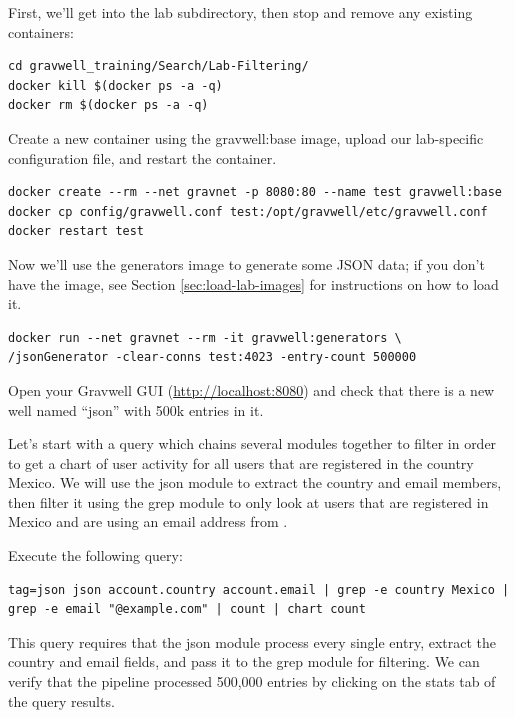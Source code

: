 First, we'll get into the lab subdirectory, then stop and remove any existing containers:

\begin{Verbatim}[breaklines=true]
cd gravwell_training/Search/Lab-Filtering/
docker kill $(docker ps -a -q)
docker rm $(docker ps -a -q)
\end{Verbatim}

Create a new container using the gravwell:base image, upload our lab-specific
configuration file, and restart the container.

\begin{Verbatim}[breaklines=true]
docker create --rm --net gravnet -p 8080:80 --name test gravwell:base
docker cp config/gravwell.conf test:/opt/gravwell/etc/gravwell.conf
docker restart test
\end{Verbatim}

Now we'll use the generators image to generate some JSON data; if you don't have the  image, see Section \ref{sec:load-lab-images} for instructions on how to load it.

\begin{Verbatim}[breaklines=true]
docker run --net gravnet --rm -it gravwell:generators \
/jsonGenerator -clear-conns test:4023 -entry-count 500000
\end{Verbatim}

Open your Gravwell GUI (\href{http://localhost:8080}{http://localhost:8080}) and check
that there is a new well named ``json'' with 500k entries in it.

Let's start with a query which chains several modules together to
filter in order to get a chart of user activity for all users that are
registered in the country Mexico. We will use the json module to
extract the country and email members, then filter it using the grep
module to only look at users that are registered in Mexico and are using
an email address from \code{example.com}.

Execute the following query:

\begin{Verbatim}[breaklines=true]
tag=json json account.country account.email | grep -e country Mexico |
grep -e email "@example.com" | count | chart count
\end{Verbatim}

This query requires that the json module process every single entry,
extract the country and email fields, and pass it to the grep module
for filtering. We can verify that the pipeline processed 500,000
entries by clicking on the stats tab of the query results.

